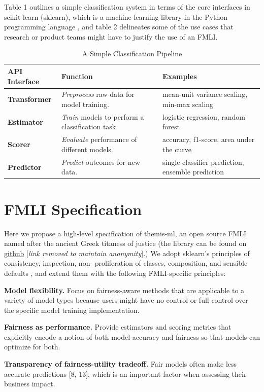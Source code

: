 \documentclass{interact}
\begin{document}
Table 1 outlines a simple classification system in terms of the core interfaces
in scikit-learn (sklearn), which is a machine learning library in the Python
programming language \cite{scikit-learn}, and table 2 delineates some of the
use cases that research or product teams might have to justify the use of an
FMLI.


\begin{table}
  \caption{A Simple Classification Pipeline}
  \renewcommand{\arraystretch}{1.75}
  \small\noindent\begin{tabularx}{\linewidth}{l X X}
    \textbf{API Interface} & \textbf{Function} & \textbf{Examples} \\
    \hline
    \textbf{Transformer} &
      \emph{Preprocess} raw data for model training. &
      mean-unit variance scaling, min-max scaling \\
    \textbf{Estimator} &
      \emph{Train} models to perform a classification task. &
      logistic regression, random forest \\
    \textbf{Scorer} &
      \emph{Evaluate} performance of different models. &
      accuracy, f1-score, area under the curve \\
    \textbf{Predictor} &
      \emph{Predict} outcomes for new data. &
      single-classifier prediction, ensemble prediction
  \end{tabularx}
\end{table}


\section{FMLI Specification}

Here we propose a high-level specification of themis-ml, an open source FMLI
named after the ancient Greek titaness of justice (the library can be found on
\underline{github} [\emph{link removed to maintain anonymity}].)
We adopt sklearn's principles of consistency, inspection, non- proliferation of
classes, composition, and sensible defaults \cite{buitinck2013api}, and extend
them with the following FMLI-specific principles:

\begin{hangparas}{.15in}{1}
  \textbf{Model flexibility.} Focus on fairness-aware methods that are applicable
    to a variety of model types because users might have no control or full
    control over the specific model training implementation.
\end{hangparas}
\begin{hangparas}{.15in}{1}
  \textbf{Fairness as performance.} Provide estimators and scoring metrics that
    explicitly encode a notion of both model accuracy and fairness so that models
    can optimize for both.
\end{hangparas}
\begin{hangparas}{.15in}{1}
\textbf{Transparency of fairness-utility tradeoff.} Fair models often make less
  accurate predictions [8, 13], which is an important factor when assessing
  their business impact.
\end{hangparas}
\end{document}
